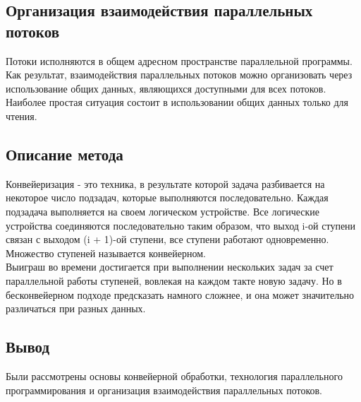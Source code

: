 \documentclass[a4paper, 12pt]{article}
\begin{document}
\begin{flushleft}
	\subsection{Организация взаимодействия параллельных потоков}
	\hspace*{5mm} Потоки исполняются в общем адресном пространстве параллельной программы. Как результат, взаимодействия параллельных потоков можно организовать через использование общих данных, являющихся доступными для всех потоков. Наиболее простая ситуация состоит в использовании общих данных только для чтения.
	\subsection{Описание метода}
	\hspace*{5mm} Конвейеризация - это техника, в результате которой задача разбивается на некоторое число подзадач, которые выполняются последовательно. Каждая подзадача выполняется на своем логическом устройстве. Все логические устройства соединяются последовательно таким образом, что выход i-ой ступени связан с выходом (i + 1)-ой ступени, все ступени работают одновременно. Множество ступеней называется конвейерном.
	\\ \hspace*{5mm} Выиграш во времени достигается при выполнении нескольких задач за счет параллельной работы ступеней, вовлекая на каждом такте новую задачу. Но в бесконвейерном подходе предсказать намного сложнее, и она может значительно различаться при разных данных.
	\subsection{Вывод}
	\hspace*{5mm} Были рассмотрены основы конвейерной обработки, технология параллельного программирования и организация взаимодействия параллельных потоков.
\end{flushleft}

\newpage
\end{document}

